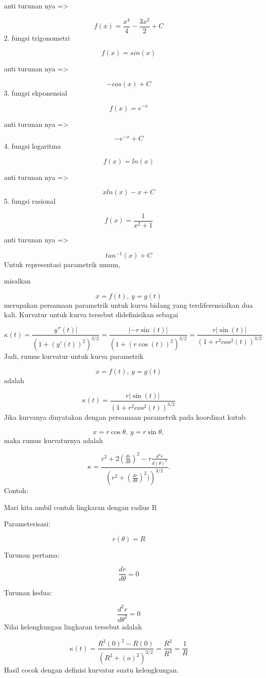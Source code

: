 \documentclass[
]{book}
\begin{document}
anti turunan nya =\textgreater{}

\[f(x)=\frac{x^4}{4}-\frac{3x^2}{2}+ C\]2. fungsi trigonometri

\[f(x)= sin(x)\]

anti turunan nya =\textgreater{}

\[-cos(x)+ C\]3. fungsi ekponensial

\[f(x)= e^{-x}\]

anti turunan nya =\textgreater{}

\[-e^{-x} + C\]4. fungsi logaritma

\[f(x)=ln(x)\]

anti turunan nya =\textgreater{}

\[xln(x)-x+ C\]5. fungsi rasional

\[f(x)=\frac{1}{x^2+1}\]

anti turunan nya =\textgreater{}

\[tan^{-1}(x)+ C\]Untuk representasi parametrik umum,

misalkan

\[x = f(t),\ y= g(t)\]merupakan persamaan parametrik untuk kurva bidang yang terdiferensialkan dua kali. Kurvatur untuk kurva tersebut didefinisikan sebagai

\[\kappa(t)=\frac{y''(t)|}{\left(1+(y'(t))^2\right)^{3/2}}=\frac{|-r\sin(t)|}{\left(1+(r\cos(t))^2\right)^{3/2}}=\frac{r|\sin(t)|}{\left(1+r^2cos^2(t)\right)^{3/2}}\]Jadi, rumus kurvatur untuk kurva parametrik

\[x=f(t),\ y=g(t)\]adalah

\[\kappa(t) = \frac{r|\sin(t)|}{\left(1+r^2cos^2(t)\right)^{3/2}}\]Jika kurvanya dinyatakan dengan persamaan parametrik pada koordinat kutub

\[x=r\cos\theta,\ y=r\sin\theta,\]maka rumus kurvaturnya adalah

\[\kappa = \frac{r^2+2(\frac{dr}{d\theta})^2-r\frac{d^2r}{d(\theta)^2}}{\left(r^2+(\frac{dr}{d\theta})^2)\right)^{3/2}}.\]Contoh:

Mari kita ambil contoh lingkaran dengan radius R

Parameterisasi:

\[r(\theta)=R\]

Turunan pertama:

\[\frac{dr}{d\theta}=0\]

Turunan kedua:

\[\frac{d^2r}{d\theta^2}=0\]Nilai kelengkungan lingkaran tersebut adalah

\[\kappa(t)=\frac{R^2(0)^2-R(0)}{\left(R^2+(o)^2\right)^{3/2}}=\frac{R^2}{R^3}=\frac{1}{R}\]Hasil cocok dengan definisi kurvatur suatu kelengkungan.
\end{document}
